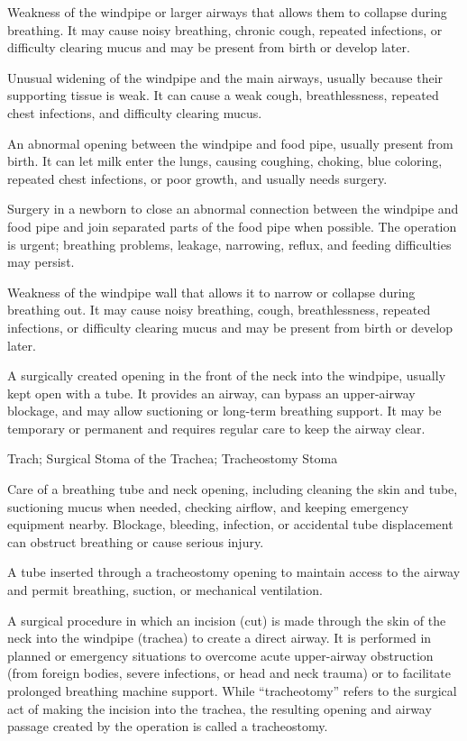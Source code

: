  Weakness of the windpipe or larger airways that allows them to collapse during breathing. It may cause noisy breathing, chronic cough, repeated infections, or difficulty clearing mucus and may be present from birth or develop later.

 Unusual widening of the windpipe and the main airways, usually because their supporting tissue is weak. It can cause a weak cough, breathlessness, repeated chest infections, and difficulty clearing mucus.

 An abnormal opening between the windpipe and food pipe, usually present from birth. It can let milk enter the lungs, causing coughing, choking, blue coloring, repeated chest infections, or poor growth, and usually needs surgery.

 Surgery in a newborn to close an abnormal connection between the windpipe and food pipe and join separated parts of the food pipe when possible. The operation is urgent; breathing problems, leakage, narrowing, reflux, and feeding difficulties may persist.

 Weakness of the windpipe wall that allows it to narrow or collapse during breathing out. It may cause noisy breathing, cough, breathlessness, repeated infections, or difficulty clearing mucus and may be present from birth or develop later.

 A surgically created opening in the front of the neck into the windpipe, usually kept open with a tube. It provides an airway, can bypass an upper-airway blockage, and may allow suctioning or long-term breathing support. It may be temporary or permanent and requires regular care to keep the airway clear.

\synonyms
Trach; Surgical Stoma of the Trachea; Tracheostomy Stoma

 Care of a breathing tube and neck opening, including cleaning the skin and tube, suctioning mucus when needed, checking airflow, and keeping emergency equipment nearby. Blockage, bleeding, infection, or accidental tube displacement can obstruct breathing or cause serious injury.

 A tube inserted through a tracheostomy opening to maintain access to the airway and permit breathing,
suction, or mechanical ventilation.

 A surgical procedure in which an incision (cut) is made through the skin of the neck into the windpipe (trachea) to create a direct airway. It is performed in planned or emergency situations to overcome acute upper-airway obstruction (from foreign bodies, severe infections, or head and neck trauma) or to facilitate prolonged breathing machine support. While ``tracheotomy'' refers to the surgical act of making the incision into the trachea, the resulting opening and airway passage created by the operation is called a tracheostomy.

